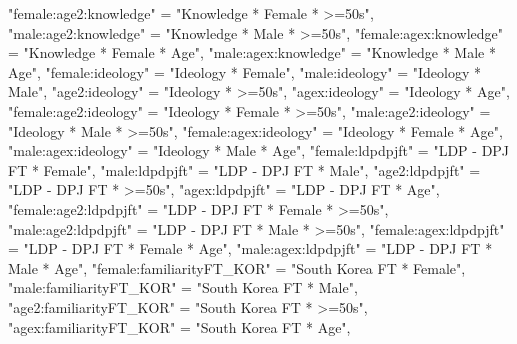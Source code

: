 \documentclass[
]{article}
\newenvironment{Shaded}{\begin{snugshade}}{\end{snugshade}}
\newcommand{\NormalTok}[1]{#1}
\newcommand{\StringTok}[1]{\textcolor[rgb]{0.31,0.60,0.02}{#1}}
\begin{document}
\begin{Shaded}
\begin{Highlighting}[]
              \StringTok{"female:age2:knowledge"}\NormalTok{ =}\StringTok{ "Knowledge * Female * >=50s"}\NormalTok{,}
              \StringTok{"male:age2:knowledge"}\NormalTok{ =}\StringTok{ "Knowledge * Male * >=50s"}\NormalTok{,}
              \StringTok{"female:agex:knowledge"}\NormalTok{ =}\StringTok{ "Knowledge * Female * Age"}\NormalTok{,}
              \StringTok{"male:agex:knowledge"}\NormalTok{ =}\StringTok{ "Knowledge * Male * Age"}\NormalTok{,}
              \StringTok{"female:ideology"}\NormalTok{ =}\StringTok{ "Ideology * Female"}\NormalTok{,}
              \StringTok{"male:ideology"}\NormalTok{ =}\StringTok{ "Ideology * Male"}\NormalTok{,}
              \StringTok{"age2:ideology"}\NormalTok{ =}\StringTok{ "Ideology * >=50s"}\NormalTok{,}
              \StringTok{"agex:ideology"}\NormalTok{ =}\StringTok{ "Ideology * Age"}\NormalTok{,}
              \StringTok{"female:age2:ideology"}\NormalTok{ =}\StringTok{ "Ideology * Female * >=50s"}\NormalTok{,}
              \StringTok{"male:age2:ideology"}\NormalTok{ =}\StringTok{ "Ideology * Male * >=50s"}\NormalTok{,}
              \StringTok{"female:agex:ideology"}\NormalTok{ =}\StringTok{ "Ideology * Female * Age"}\NormalTok{,}
              \StringTok{"male:agex:ideology"}\NormalTok{ =}\StringTok{ "Ideology * Male * Age"}\NormalTok{,}
              \StringTok{"female:ldpdpjft"}\NormalTok{ =}\StringTok{ "LDP - DPJ FT * Female"}\NormalTok{,}
              \StringTok{"male:ldpdpjft"}\NormalTok{ =}\StringTok{ "LDP - DPJ FT * Male"}\NormalTok{,}
              \StringTok{"age2:ldpdpjft"}\NormalTok{ =}\StringTok{ "LDP - DPJ FT * >=50s"}\NormalTok{,}
              \StringTok{"agex:ldpdpjft"}\NormalTok{ =}\StringTok{ "LDP - DPJ FT * Age"}\NormalTok{,}
              \StringTok{"female:age2:ldpdpjft"}\NormalTok{ =}\StringTok{ "LDP - DPJ FT * Female * >=50s"}\NormalTok{,}
              \StringTok{"male:age2:ldpdpjft"}\NormalTok{ =}\StringTok{ "LDP - DPJ FT * Male * >=50s"}\NormalTok{,}
              \StringTok{"female:agex:ldpdpjft"}\NormalTok{ =}\StringTok{ "LDP - DPJ FT * Female * Age"}\NormalTok{,}
              \StringTok{"male:agex:ldpdpjft"}\NormalTok{ =}\StringTok{ "LDP - DPJ FT * Male * Age"}\NormalTok{,}
              \StringTok{"female:familiarityFT_KOR"}\NormalTok{ =}\StringTok{ "South Korea FT * Female"}\NormalTok{,}
              \StringTok{"male:familiarityFT_KOR"}\NormalTok{ =}\StringTok{ "South Korea FT * Male"}\NormalTok{,}
              \StringTok{"age2:familiarityFT_KOR"}\NormalTok{ =}\StringTok{ "South Korea FT * >=50s"}\NormalTok{,}
              \StringTok{"agex:familiarityFT_KOR"}\NormalTok{ =}\StringTok{ "South Korea FT * Age"}\NormalTok{,}

\end{Highlighting}
\end{Shaded}
\end{document}
